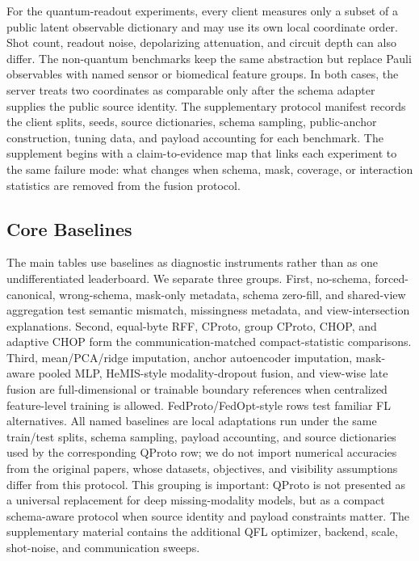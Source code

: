 \documentclass[preprint]{elsarticle}
\begin{document}
For the quantum-readout experiments, every client measures only a subset of a public latent observable dictionary and may use its own local coordinate order. Shot count, readout noise, depolarizing attenuation, and circuit depth can also differ. The non-quantum benchmarks keep the same abstraction but replace Pauli observables with named sensor or biomedical feature groups. In both cases, the server treats two coordinates as comparable only after the schema adapter supplies the public source identity. The supplementary protocol manifest records the client splits, seeds, source dictionaries, schema sampling, public-anchor construction, tuning data, and payload accounting for each benchmark.
The supplement begins with a claim-to-evidence map that links each experiment to the same failure mode: what changes when schema, mask, coverage, or interaction statistics are removed from the fusion protocol.

\subsection{Core Baselines}

The main tables use baselines as diagnostic instruments rather than as one undifferentiated leaderboard. We separate three groups. First, no-schema, forced-canonical, wrong-schema, mask-only metadata, schema zero-fill, and shared-view aggregation test semantic mismatch, missingness metadata, and view-intersection explanations. Second, equal-byte RFF, CProto, group CProto, CHOP, and adaptive CHOP form the communication-matched compact-statistic comparisons. Third, mean/PCA/ridge imputation, anchor autoencoder imputation, mask-aware pooled MLP, HeMIS-style modality-dropout fusion, and view-wise late fusion are full-dimensional or trainable boundary references when centralized feature-level training is allowed. FedProto/FedOpt-style rows test familiar FL alternatives. All named baselines are local adaptations run under the same train/test splits, schema sampling, payload accounting, and source dictionaries used by the corresponding QProto row; we do not import numerical accuracies from the original papers, whose datasets, objectives, and visibility assumptions differ from this protocol. This grouping is important: QProto is not presented as a universal replacement for deep missing-modality models, but as a compact schema-aware protocol when source identity and payload constraints matter. The supplementary material contains the additional QFL optimizer, backend, scale, shot-noise, and communication sweeps.
\end{document}
